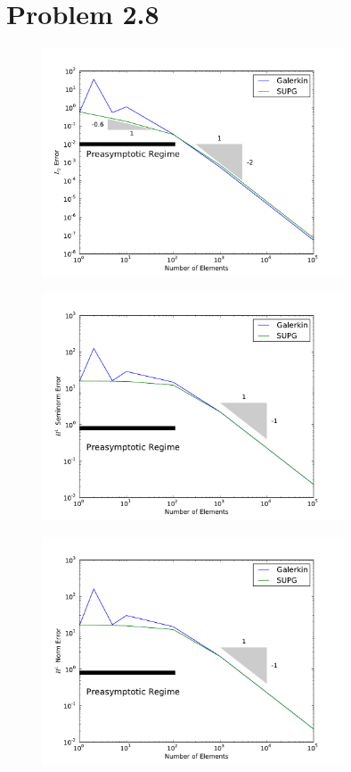 \documentclass[12pt]{article}
\begin{document}
\section*{Problem 2.8}
\begin{figure}[h!]
\centering
\includegraphics[width=0.8\textwidth]{L2Norm.pdf}
\end{figure}

\begin{figure}[h!]
\centering
\includegraphics[width=0.8\textwidth]{H1Seminorm.pdf}
\end{figure}

\begin{figure}[h!]
\centering
\includegraphics[width=0.8\textwidth]{H1Norm.pdf}
\end{figure}
\end{document}
